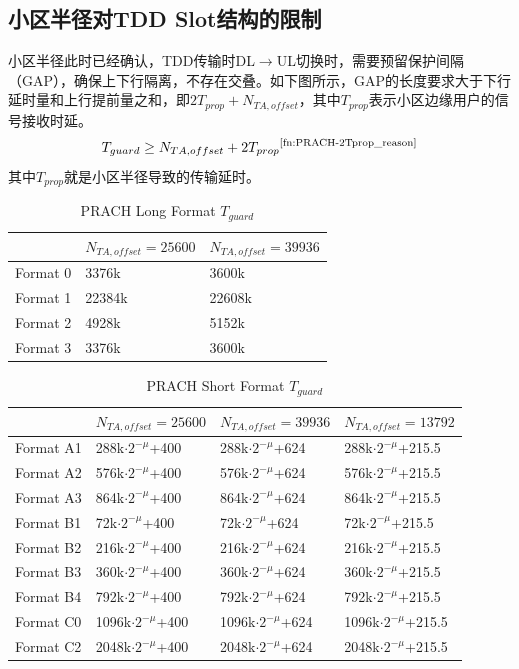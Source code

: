 \documentclass{article}
\begin{document}
\subsection{小区半径对TDD Slot结构的限制}
小区半径此时已经确认，TDD传输时DL$\to$UL切换时，需要预留保护间隔（GAP），确保上下行隔离，不存在交叠。如下图所示，GAP的长度要求大于下行延时量和上行提前量之和，即$2T_{prop}+N_{TA,offset}$，其中$T_{prop}$表示小区边缘用户的信号接收时延。
\[
T_{guard} \geq N_{TA,offset} + 2T_{prop}\textsuperscript{\ref{fn:PRACH-2Tprop_reason}}
\]
其中$T_{prop}$就是小区半径导致的传输延时。
\begin{longtable}{|p{}|p{}|p{}|}
\caption{PRACH Long Format $T_{guard} $}\\
\hline
 & \multicolumn{1}{|c|}{$N_{TA,offset}=25600$} & \multicolumn{1}{|c|}{$N_{TA,offset}=39936$} \\ \hline
Format 0 & 3376k & 3600k \\ \hline
Format 1 & 22384k & 22608k \\ \hline
Format 2 & 4928k & 5152k \\ \hline
Format 3 & 3376k & 3600k \\ \hline
\end{longtable}

\begin{longtable}{|p{}|p{}|p{}|p{}|}
\caption{PRACH Short Format $T_{guard} $}\\
\hline
& \multicolumn{1}{|c|}{$N_{TA,offset}=25600$} & \multicolumn{1}{|c|}{$N_{TA,offset}=39936$} & \multicolumn{1}{|c|}{$N_{TA,offset}=13792$} \\ \hline
Format A1 & 288k$\cdot 2^{-\mu}$+400 & 288k$\cdot 2^{-\mu}$+624 & 288k$\cdot 2^{-\mu}$+215.5 \\ \hline
Format A2 & 576k$\cdot 2^{-\mu}$+400 & 576k$\cdot 2^{-\mu}$+624 & 576k$\cdot 2^{-\mu}$+215.5 \\ \hline
Format A3 & 864k$\cdot 2^{-\mu}$+400 & 864k$\cdot 2^{-\mu}$+624 & 864k$\cdot 2^{-\mu}$+215.5 \\ \hline
Format B1 & 72k$\cdot 2^{-\mu}$+400 & 72k$\cdot 2^{-\mu}$+624 & 72k$\cdot 2^{-\mu}$+215.5 \\ \hline
Format B2 & 216k$\cdot 2^{-\mu}$+400 & 216k$\cdot 2^{-\mu}$+624 & 216k$\cdot 2^{-\mu}$+215.5 \\ \hline
Format B3 & 360k$\cdot 2^{-\mu}$+400 & 360k$\cdot 2^{-\mu}$+624 & 360k$\cdot 2^{-\mu}$+215.5 \\ \hline
Format B4 & 792k$\cdot 2^{-\mu}$+400 & 792k$\cdot 2^{-\mu}$+624 & 792k$\cdot 2^{-\mu}$+215.5 \\ \hline
Format C0 & 1096k$\cdot 2^{-\mu}$+400 & 1096k$\cdot 2^{-\mu}$+624 & 1096k$\cdot 2^{-\mu}$+215.5 \\ \hline
Format C2 & 2048k$\cdot 2^{-\mu}$+400 & 2048k$\cdot 2^{-\mu}$+624 & 2048k$\cdot 2^{-\mu}$+215.5 \\ \hline
\end{longtable}
\end{document}
